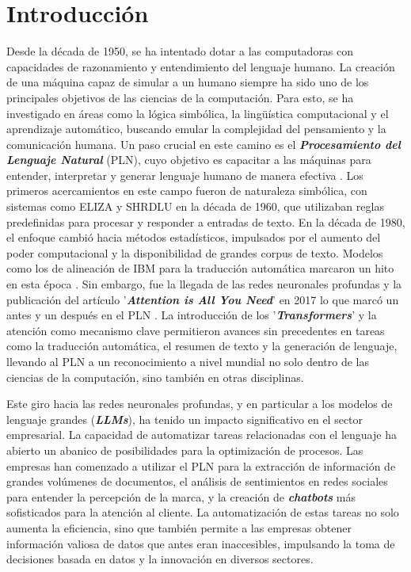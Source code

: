 \chapter*{Introducción}\label{chapter:introduction}
Desde la década de 1950, se ha intentado dotar a las computadoras con capacidades de razonamiento y entendimiento del lenguaje humano. La creación de una máquina capaz de simular a un humano siempre ha sido uno de los principales objetivos de las ciencias de la computación. Para esto, se ha investigado en áreas como la lógica simbólica, la lingüística computacional y el aprendizaje automático, buscando emular la complejidad del pensamiento y la comunicación humana.
Un paso crucial en este camino es el \textit{\textbf{Procesamiento del Lenguaje Natural}} (PLN), cuyo objetivo es capacitar a las máquinas para entender, interpretar y generar lenguaje humano de manera efectiva \cite{khurana2023natural}. Los primeros acercamientos en este campo fueron de naturaleza simbólica, con sistemas como ELIZA \cite{weizenbaum1966eliza} y SHRDLU \cite{winograd1971procedures} en la década de 1960, que utilizaban reglas predefinidas para procesar y responder a entradas de texto.
En la década de 1980, el enfoque cambió hacia métodos estadísticos, impulsados por el aumento del poder computacional y la disponibilidad de grandes corpus de texto. Modelos como los de alineación de IBM para la traducción automática marcaron un hito en esta época \cite{brown1993mathematics}. Sin embargo, fue la llegada de las redes neuronales profundas y la publicación del artículo '\textit{\textbf{Attention is All You Need}}' en 2017 lo que marcó un antes y un después en el PLN \cite{vaswani2017attention}.
La introducción de los '\textit{\textbf{Transformers}}' y la atención como mecanismo clave permitieron avances sin precedentes en tareas como la traducción automática, el resumen de texto y la generación de lenguaje, llevando al PLN a un reconocimiento a nivel mundial no solo dentro de las ciencias de la computación, sino también en otras disciplinas.

Este giro hacia las redes neuronales profundas, y en particular a los modelos de lenguaje grandes (\textit{\textbf{LLMs}}), ha tenido un impacto significativo en el sector empresarial. La capacidad de automatizar tareas relacionadas con el lenguaje ha abierto un abanico de posibilidades para la optimización de procesos. Las empresas han comenzado a utilizar el PLN para la extracción de información de grandes volúmenes de documentos, el análisis de sentimientos en redes sociales para entender la percepción de la marca, y la creación de \textit{\textbf{chatbots}} más sofisticados para la atención al cliente.
La automatización de estas tareas no solo aumenta la eficiencia, sino que también permite a las empresas obtener información valiosa de datos que antes eran inaccesibles, impulsando la toma de decisiones basada en datos y la innovación en diversos sectores.


